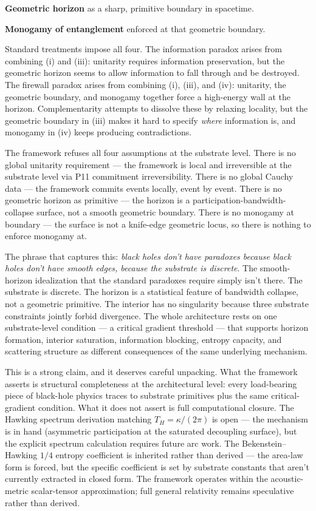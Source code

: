 \documentclass[11pt,a4paper]{article}
\begin{document}
\textbf{Geometric horizon} as a sharp, primitive boundary in spacetime.

\textbf{Monogamy of entanglement} enforced at that geometric boundary.

Standard treatments impose all four. The information paradox arises from combining (i) and (iii): unitarity requires information preservation, but the geometric horizon seems to allow information to fall through and be destroyed. The firewall paradox arises from combining (i), (iii), and (iv): unitarity, the geometric boundary, and monogamy together force a high-energy wall at the horizon. Complementarity attempts to dissolve these by relaxing locality, but the geometric boundary in (iii) makes it hard to specify \emph{where} information is, and monogamy in (iv) keeps producing contradictions.

The framework refuses all four assumptions at the substrate level. There is no global unitarity requirement --- the framework is local and irreversible at the substrate level via P11 commitment irreversibility. There is no global Cauchy data --- the framework commits events locally, event by event. There is no geometric horizon as primitive --- the horizon is a participation-bandwidth-collapse surface, not a smooth geometric boundary. There is no monogamy at boundary --- the surface is not a knife-edge geometric locus, so there is nothing to enforce monogamy at.

The phrase that captures this: \emph{black holes don't have paradoxes because black holes don't have smooth edges, because the substrate is discrete}. The smooth-horizon idealization that the standard paradoxes require simply isn't there. The substrate is discrete. The horizon is a statistical feature of bandwidth collapse, not a geometric primitive. The interior has no singularity because three substrate constraints jointly forbid divergence. The whole architecture rests on one substrate-level condition --- a critical gradient threshold --- that supports horizon formation, interior saturation, information blocking, entropy capacity, and scattering structure as different consequences of the same underlying mechanism.

This is a strong claim, and it deserves careful unpacking. What the framework asserts is structural completeness at the architectural level: every load-bearing piece of black-hole physics traces to substrate primitives plus the same critical-gradient condition. What it does not assert is full computational closure. The Hawking spectrum derivation matching $T_H = \kappa/(2\pi)$ is open --- the mechanism is in hand (asymmetric participation at the saturated decoupling surface), but the explicit spectrum calculation requires future arc work. The Bekenstein--Hawking $1/4$ entropy coefficient is inherited rather than derived --- the area-law form is forced, but the specific coefficient is set by substrate constants that aren't currently extracted in closed form. The framework operates within the acoustic-metric scalar-tensor approximation; full general relativity remains speculative rather than derived.
\end{document}
